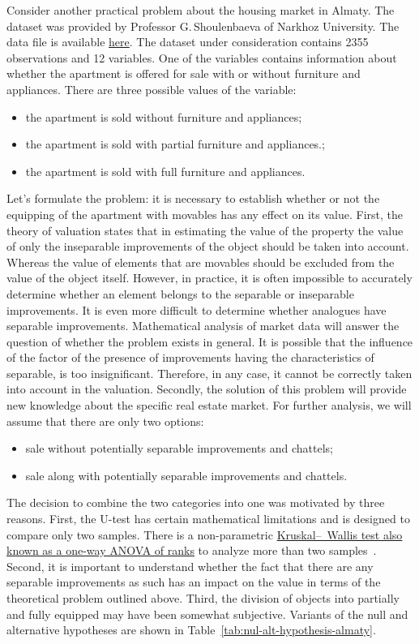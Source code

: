 \documentclass[]{scrreprt}
\begin{document}
Consider another practical problem about the housing market in Almaty. The dataset was provided by Professor G.\,Shoulenbaeva of Narkhoz University. The data file is available \href{https://github.com/Kirill-Murashev/AI_for_valuers_book/blob/main/Parts-Chapters/Mann-Whitney-Wilcoxon/almaty-apts-2019-1.csv}{here}\cite{ds:almaty-apts-2019-1}. The dataset under consideration contains 2355 observations and 12 variables. One of the variables contains information about whether the apartment is offered for sale with or without furniture and appliances. There are three possible values of the variable:
\begin{itemize}
	\item the apartment is sold without furniture and appliances;
	\item the apartment is sold with partial furniture and appliances.;
	\item the apartment is sold with full furniture and appliances. 
\end{itemize}
%
Let's formulate the problem: it is necessary to establish whether or not the equipping of the apartment with movables has any effect on its value. First, the theory of valuation states that in estimating the value of the property the value of only the inseparable improvements of the object should be taken into account. Whereas the value of elements that are movables should be excluded from the value of the object itself. However, in practice, it is often impossible to accurately determine whether an element belongs to the separable or inseparable improvements. It is even more difficult to determine whether analogues have separable improvements. Mathematical analysis of market data will answer the question of whether the problem exists in general. It is possible that the influence of the factor of the presence of improvements having the characteristics of separable, is too insignificant.  Therefore, in any case, it cannot be correctly taken into account in the valuation.  Secondly, the solution of this problem will provide new knowledge about the specific real estate market. For further analysis, we will assume that there are only two options:
\begin{itemize}
	\item sale without potentially separable improvements and chattels;
	\item sale along with potentially separable improvements and chattels.
\end{itemize}
The decision to combine the two categories into one was motivated by three reasons. First, the U-test has certain mathematical limitations and is designed to compare only two samples. There is a non-parametric \href{https://en.wikipedia.org/wiki/Kruskal–Wallis_one-way_analysis_of_variance}{ Kruskal--~Wallis test also known as a one-way ANOVA of ranks} to analyze more than two samples~\cite{Wiki:Kruskal-Wallis}. Second, it is important to understand whether the fact that there are any separable improvements as such has an impact on the value in terms of the theoretical problem outlined above. Third, the division of objects into partially and fully equipped may have been somewhat subjective. Variants of the null and alternative hypotheses are shown in Table~\ref{tab:nul-alt-hypothesis-almaty}.
\end{document}
